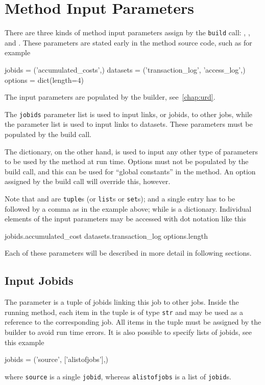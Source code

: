 \section{Method Input Parameters}
\label{sec:input_params}

There are three kinds of method input parameters assign by
the \texttt{build} call: \jobids, \datasets, and \options.  These
parameters are stated early in the method source code, such as for
example
\begin{python}
jobids = ('accumulated_costs',)
datasets = ('transaction_log', 'access_log',)
options = dict(length=4)
\end{python}
The input parameters are populated by the
builder, see~\ref{chap:urd}.

The \texttt{jobids} parameter list is used to input links, or jobids,
to other jobs, while the \datasets parameter list is used to input
links to datasets.  These parameters must be populated by the build
call.

The \options dictionary, on the other hand, is used to input any other
type of parameters to be used by the method at run time.  Options must
not be populated by the build call, and this can be used for ``global
constants'' in the method.  An option assigned by the build call will
override this, however.

Note that \jobids and \datasets are \texttt{tuple}s (or \texttt{list}s
or \texttt{set}s); and a single entry has to be followed by a comma as
in the example above; while \options is a dictionary.  Individual
elements of the input parameters may be accessed with dot notation
like this
\begin{python}
jobids.accumulated_cost
datasets.transaction_log
options.length
\end{python}
Each of these parameters will be described in more detail in following
sections.




\subsection*{Input Jobids}
The \jobids parameter is a tuple of jobids linking this job to other
jobs.  Inside the running method, each item in the \jobids tuple is of
type \texttt{str} and may be used as a reference to the corresponding
job.  All items in the \jobids tuple must be assigned by the builder to
avoid run time errors.
It is also possible to specify lists of jobids, see this example
\begin{python}
jobids = ('source', ['alistofjobs'],)
\end{python}
where \texttt{source} is a single \texttt{jobid}, whereas
\texttt{alistofjobs} is a list of \texttt{jobid}s.




